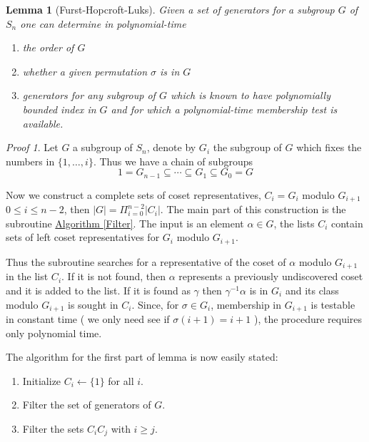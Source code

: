\documentclass[12pt,a4paper]{book}
\theoremstyle{plain}
\newtheorem{lema}{Lemma}
\theoremstyle{definition}
\theoremstyle{remark}
\newtheorem*{Proof}{Proof}
\begin{document}
\begin{lema}[Furst-Hopcroft-Luks]\label{LemaFilter}
 Given a set of generators for a subgroup $G$ of $S_n$ one can determine in polynomial-time
\begin{enumerate}
 \item the order of $G$
 \item whether a given permutation $\sigma$ is in $G$
 \item generators for any subgroup of $G$ which is known to have polynomially bounded index in $G$ and for which a polynomial-time membership
 test is available.
\end{enumerate}

\end{lema}

\begin{Proof}
 Let $G$ a subgroup of $S_n$, denote by $G_i$ the subgroup of $G$ which fixes the numbers in $\{1, \ldots, i \}$. Thus we have a chain of 
subgroups
\[
 1 = G_{n-1} \subseteq \cdots \subseteq G_1 \subseteq G_0 = G
\]

Now we construct a complete sets of coset representatives, $C_i = G_i $ modulo $G_{i+1}$ $0 \leq i \leq n-2$, then $|G| = \Pi_{i=0}^{n-2} |C_i |$. The 
main part of this construction is the subroutine \hyperlink{Filter}{Algorithm \ref{Filter}}. The input is an element $\alpha \in G$, 
the lists $C_i$ contain sets of left coset representatives for $G_i $ modulo $G_{i+1}$. 

Thus the subroutine searches for a representative of the coset of $\alpha$ modulo $G_{i+1}$ in the list $C_i$. If it is not found, then $\alpha$ 
represents a previously undiscovered coset and it is added to the list. If it is found as $\gamma$ then $\gamma^{-1} \alpha$ is in $G_i$ and its 
class modulo $G_{i+1}$ is sought in $C_i$. Since, for $\sigma \in G_i$, membership in $G_{i+1}$ is testable in constant time ( we only need see if 
$\sigma ( i+1 ) = i+1$ ), the procedure requires only polynomial time.  


The algorithm for the first part of lemma is now easily stated:
\begin{enumerate}
 \item Initialize $C_i \leftarrow \{ 1 \}$ for all $i$.
 \item Filter the set of generators of $G$.
 \item Filter the sets $C_i C_j$ with $i \geq j$.
\end{enumerate}

\begin{algorithm}\label{Filter}\hypertarget{Filter}{}
 

\end{algorithm}
\end{Proof}
\end{document}
